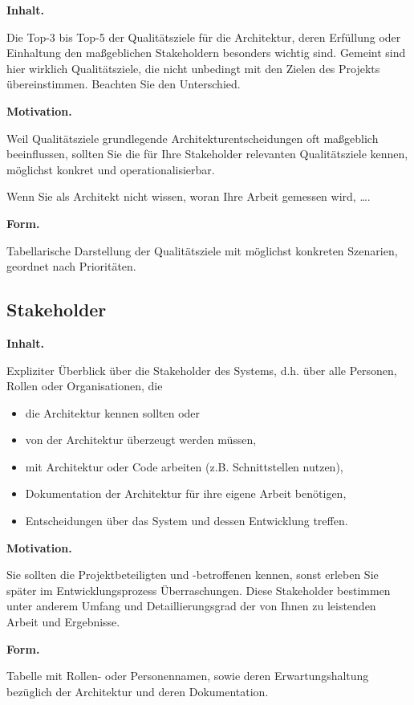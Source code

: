 \documentclass[]{article}
\begin{document}
\textbf{Inhalt.}

Die Top-3 bis Top-5 der Qualitätsziele für die Architektur, deren
Erfüllung oder Einhaltung den maßgeblichen Stakeholdern besonders
wichtig sind. Gemeint sind hier wirklich Qualitätsziele, die nicht
unbedingt mit den Zielen des Projekts übereinstimmen. Beachten Sie den
Unterschied.

\textbf{Motivation.}

Weil Qualitätsziele grundlegende Architekturentscheidungen oft
maßgeblich beeinflussen, sollten Sie die für Ihre Stakeholder relevanten
Qualitätsziele kennen, möglichst konkret und operationalisierbar.

Wenn Sie als Architekt nicht wissen, woran Ihre Arbeit gemessen wird,
\ldots{}.

\textbf{Form.}

Tabellarische Darstellung der Qualitätsziele mit möglichst konkreten
Szenarien, geordnet nach Prioritäten.

\subsection{Stakeholder}\label{_stakeholder}

\textbf{Inhalt.}

Expliziter Überblick über die Stakeholder des Systems, d.h. über alle
Personen, Rollen oder Organisationen, die

\begin{itemize}
\item
  die Architektur kennen sollten oder
\item
  von der Architektur überzeugt werden müssen,
\item
  mit Architektur oder Code arbeiten (z.B. Schnittstellen nutzen),
\item
  Dokumentation der Architektur für ihre eigene Arbeit benötigen,
\item
  Entscheidungen über das System und dessen Entwicklung treffen.
\end{itemize}

\textbf{Motivation.}

Sie sollten die Projektbeteiligten und -betroffenen kennen, sonst
erleben Sie später im Entwicklungsprozess Überraschungen. Diese
Stakeholder bestimmen unter anderem Umfang und Detaillierungsgrad der
von Ihnen zu leistenden Arbeit und Ergebnisse.

\textbf{Form.}

Tabelle mit Rollen- oder Personennamen, sowie deren Erwartungshaltung
bezüglich der Architektur und deren Dokumentation.
\end{document}
